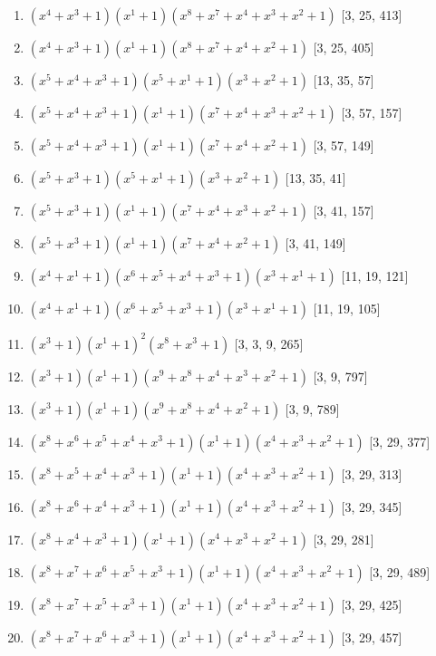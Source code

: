 \documentclass[10pt,twocolumn]{article}
\begin{document}
\begin{enumerate}
\item $(x^{4} + x^{3} + 1)(x^{1} + 1)(x^{8} + x^{7} + x^{4} + x^{3} + x^{2} + 1)$  [3, 25, 413]
\item $(x^{4} + x^{3} + 1)(x^{1} + 1)(x^{8} + x^{7} + x^{4} + x^{2} + 1)$  [3, 25, 405]
\item $(x^{5} + x^{4} + x^{3} + 1)(x^{5} + x^{1} + 1)(x^{3} + x^{2} + 1)$  [13, 35, 57]
\item $(x^{5} + x^{4} + x^{3} + 1)(x^{1} + 1)(x^{7} + x^{4} + x^{3} + x^{2} + 1)$  [3, 57, 157]
\item $(x^{5} + x^{4} + x^{3} + 1)(x^{1} + 1)(x^{7} + x^{4} + x^{2} + 1)$  [3, 57, 149]
\item $(x^{5} + x^{3} + 1)(x^{5} + x^{1} + 1)(x^{3} + x^{2} + 1)$  [13, 35, 41]
\item $(x^{5} + x^{3} + 1)(x^{1} + 1)(x^{7} + x^{4} + x^{3} + x^{2} + 1)$  [3, 41, 157]
\item $(x^{5} + x^{3} + 1)(x^{1} + 1)(x^{7} + x^{4} + x^{2} + 1)$  [3, 41, 149]
\item $(x^{4} + x^{1} + 1)(x^{6} + x^{5} + x^{4} + x^{3} + 1)(x^{3} + x^{1} + 1)$  [11, 19, 121]
\item $(x^{4} + x^{1} + 1)(x^{6} + x^{5} + x^{3} + 1)(x^{3} + x^{1} + 1)$  [11, 19, 105]
\item $(x^{3} + 1)(x^{1} + 1)^{2}(x^{8} + x^{3} + 1)$  [3, 3, 9, 265]
\item $(x^{3} + 1)(x^{1} + 1)(x^{9} + x^{8} + x^{4} + x^{3} + x^{2} + 1)$  [3, 9, 797]
\item $(x^{3} + 1)(x^{1} + 1)(x^{9} + x^{8} + x^{4} + x^{2} + 1)$  [3, 9, 789]
\item $(x^{8} + x^{6} + x^{5} + x^{4} + x^{3} + 1)(x^{1} + 1)(x^{4} + x^{3} + x^{2} + 1)$  [3, 29, 377]
\item $(x^{8} + x^{5} + x^{4} + x^{3} + 1)(x^{1} + 1)(x^{4} + x^{3} + x^{2} + 1)$  [3, 29, 313]
\item $(x^{8} + x^{6} + x^{4} + x^{3} + 1)(x^{1} + 1)(x^{4} + x^{3} + x^{2} + 1)$  [3, 29, 345]
\item $(x^{8} + x^{4} + x^{3} + 1)(x^{1} + 1)(x^{4} + x^{3} + x^{2} + 1)$  [3, 29, 281]
\item $(x^{8} + x^{7} + x^{6} + x^{5} + x^{3} + 1)(x^{1} + 1)(x^{4} + x^{3} + x^{2} + 1)$  [3, 29, 489]
\item $(x^{8} + x^{7} + x^{5} + x^{3} + 1)(x^{1} + 1)(x^{4} + x^{3} + x^{2} + 1)$  [3, 29, 425]
\item $(x^{8} + x^{7} + x^{6} + x^{3} + 1)(x^{1} + 1)(x^{4} + x^{3} + x^{2} + 1)$  [3, 29, 457]

\end{enumerate}
\end{document}
